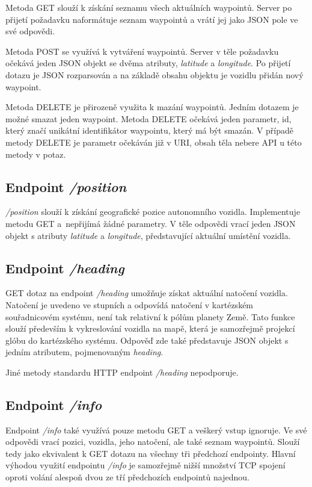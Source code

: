 \documentclass[czech, bachelor]{diploma}
\begin{document}
Metoda GET slouží k získání seznamu všech aktuálních waypointů. Server po přijetí požadavku naformátuje seznam waypointů a vrátí
jej jako JSON pole ve své odpovědi.

Metoda POST se využívá k vytváření waypointů. Server v těle požadavku očekává jeden JSON objekt se dvěma atributy, \emph{latitude}
a \emph{longitude}. Po přijetí dotazu je JSON rozparsován a na základě obsahu objektu je vozidlu přidán nový waypoint.

Metoda DELETE je přirozeně využita k mazání waypointů. Jedním dotazem je možné smazat jeden waypoint. Metoda DELETE očekává jeden
parametr, id, který značí unikátní identifikátor waypointu, který má být smazán. V případě metody DELETE je parametr očekáván již
v URI, obsah těla nebere API u této metody v potaz.

\subsection{Endpoint \emph{/position}}

\emph{/position} slouží k získání geografické pozice autonomního vozidla. Implementuje metodu GET a~nepřijímá žádné parametry.
V těle odpovědi vrací jeden JSON objekt s atributy \emph{latitude} a \emph{longitude}, představující aktuální umístění vozidla.

\subsection{Endpoint \emph{/heading}}

GET dotaz na endpoint \emph{/heading} umožňuje získat aktuální natočení vozidla. Natočení je uvedeno ve stupních a odpovídá
natočení v kartézském souřadnicovém systému, není tak relativní k pólům planety Země. Tato funkce slouží především k vykreslování
vozidla na mapě, která je samozřejmě projekcí glóbu do kartézského systému. Odpověď zde také představuje JSON objekt s jedním
atributem, pojmenovaným \emph{heading}.

Jiné metody standardu HTTP endpoint \emph{/heading} nepodporuje.

\subsection{Endpoint \emph{/info}}

Endpoint \emph{/info} také využívá pouze metodu GET a veškerý vstup ignoruje. Ve své odpovědi vrací pozici, vozidla, jeho
natočení, ale také seznam waypointů. Slouží tedy jako ekvivalent k GET dotazu na všechny tři předchozí endpointy. Hlavní výhodou
využití endpointu \emph{/info} je samozřejmě nižší množství TCP spojení oproti volání alespoň dvou ze tří předchozích endpointů
najednou.
\end{document}
